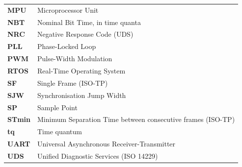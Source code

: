 {\begin{longtable}{@{}p{3.2cm} p{11cm}@{}}
\textbf{MPU}      & Microprocessor Unit \\
\textbf{NBT}      & Nominal Bit Time, in time quanta \\
\textbf{NRC}      & Negative Response Code (UDS) \\
\textbf{PLL}      & Phase-Locked Loop \\
\textbf{PWM}      & Pulse-Width Modulation \\
\textbf{RTOS}     & Real-Time Operating System \\
\textbf{SF}       & Single Frame (ISO-TP) \\
\textbf{SJW}      & Synchronisation Jump Width \\
\textbf{SP}       & Sample Point \\
\textbf{STmin}    & Minimum Separation Time between consecutive frames (ISO-TP) \\
\textbf{tq}       & Time quantum \\
\textbf{UART}     & Universal Asynchronous Receiver-Transmitter \\
\textbf{UDS}      & Unified Diagnostic Services (ISO 14229) \\
\end{longtable}
}
\pagebreak
